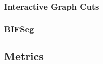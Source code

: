 \subsubsection{Interactive Graph Cuts}


\subsubsection{BIFSeg} \label{BIFSeg}




\subsection{Metrics}











